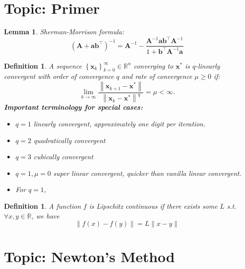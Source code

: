 \documentclass[11pt]{article}
\theoremstyle{plain} %
\newtheorem{lemma}[theorem]{Lemma}
\newtheorem{definition}[theorem]{Definition}
\theoremstyle{remark}
\begin{document}
\begin{center}

  {}
\end{center}
\vspace{2em}

\tableofcontents

\section*{Topic: Primer}
\begin{lemma}\label{lemma: Sherman-Morrison}
  Sherman-Morrison formula:
  $$
    \left(\mathbf{A} + \mathbf{a} \mathbf{b}^{\top}\right)^{-1} = \mathbf{A}^{-1} - \frac{\mathbf{A}^{-1} \mathbf{a} \mathbf{b}^{\top} \mathbf{A}^{-1}}{1 + \mathbf{b}^{\top} \mathbf{A}^{-1} \mathbf{a}}
  $$
\end{lemma}

\begin{definition}
  A sequence $\left\{\mathbf{x}_k\right\}_{k=0}^{\infty} \in \mathbb{R}^n$ converging to $\mathbf{x}^*$ is $q$-linearly convergent with order of convergence $q$ and rate of convergence $\mu \ge 0$ if:
  $$
    \lim _{k \rightarrow \infty} \frac{\left\|\mathbf{x}_{k+1}-\mathbf{x}^*\right\|}{\left\|\mathbf{x}_k-\mathbf{x}^*\right\|^q}=\mu<\infty .
  $$
  \textbf{Important terminology for special cases:}
  \begin{itemize}
    \item $q=1$ \textit{linearly convergent}, approximately one digit per iteration.
    \item $q=2$ \textit{quadratically convergent}
    \item $q=3$ \textit{cubically convergent}
    \item $q=1, \mu=0$ \textit{super linear convergent}, quicker than vanilla linear convergent.
    \item For $q=1$,
  \end{itemize}
\end{definition}

\begin{definition}
  A function $f$ is Lipschitz continuous if there exists some $L$ s.t. $\forall x, y \in \mathbb{R}$, we have
  $$
    \|f(x)-f(y)\|=L\|x-y\|
  $$
\end{definition}

\newpage
\section{Topic: Newton's Method}
\end{document}
